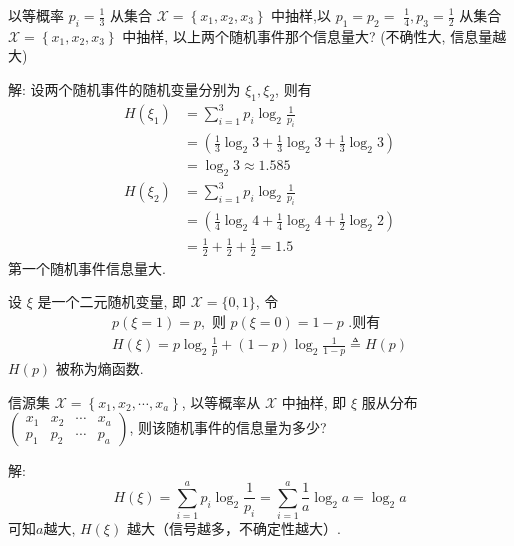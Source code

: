 \begin{example}
    以等概率 $ p_{i}=\frac{1}{3} $ 从集合 $ \mathscr{X}=\left\{x_{1}, x_{2}, x_{3}\right\} $ 中抽样,以 $ p_{1}=p_{2}= $ $ \frac{1}{4}, p_{3}=\frac{1}{2} $ 从集合 $ \mathscr{X}=\left\{x_{1}, x_{2}, x_{3}\right\} $ 中抽样, 以上两个随机事件那个信息量大? (不确性大, 信息量越大)

    解: 设两个随机事件的随机变量分别为 $ \xi_{1}, \xi_{2} $, 则有
$$
\begin{aligned}
H\left(\xi_{1}\right) & =\sum_{i=1}^{3} p_{i} \log _{2} \frac{1}{p_{i}} \\
& =\left(\frac{1}{3} \log _{2} 3+\frac{1}{3} \log _{2} 3+\frac{1}{3} \log _{2} 3\right) \\
& =\log _{2} 3 \approx 1.585 \\
H\left(\xi_{2}\right) & =\sum_{i=1}^{3} p_{i} \log _{2} \frac{1}{p_{i}} \\
& =\left(\frac{1}{4} \log _{2} 4+\frac{1}{4} \log _{2} 4+\frac{1}{2} \log _{2} 2\right) \\
& =\frac{1}{2}+\frac{1}{2}+\frac{1}{2}=1.5
\end{aligned}
$$
第一个随机事件信息量大.
\end{example}

\begin{example}
设 $ \xi $ 是一个二元随机变量, 即 $ \mathscr{X}=\{0,1\} $, 令
$$
\begin{array}{l}
p(\xi=1)=p, \text { 则 } p(\xi=0)=1-p \text { .则有 } \\
H(\xi)=p \log _{2} \frac{1}{p}+(1-p) \log _{2} \frac{1}{1-p}\triangleq H(p)
\end{array}
$$
$ H(p) $ 被称为熵函数.
\end{example}
\begin{example}
    信源集 $ \mathscr{X}=\left\{x_{1}, x_{2}, \cdots, x_{a}\right\} $, 以等概率从 $ \mathscr{X} $ 中抽样, 即 $ \xi $ 服从分布 $ \left(\begin{array}{llll}x_{1} & x_{2} & \cdots & x_{a} \\ p_{1} & p_{2} & \cdots & p_{a}\end{array}\right) $, 则该随机事件的信息量为多少?

解: $$ H(\xi)=\sum\limits_{i=1}^{a} p_{i} \log _{2} \frac{1}{p_{i}} =\sum_{i=1}^{a} \frac{1}{a} \log _{2} a=\log _{2}a $$
可知$a$越大, $ H(\xi) $ 越大（信号越多，不确定性越大）.
\end{example}

